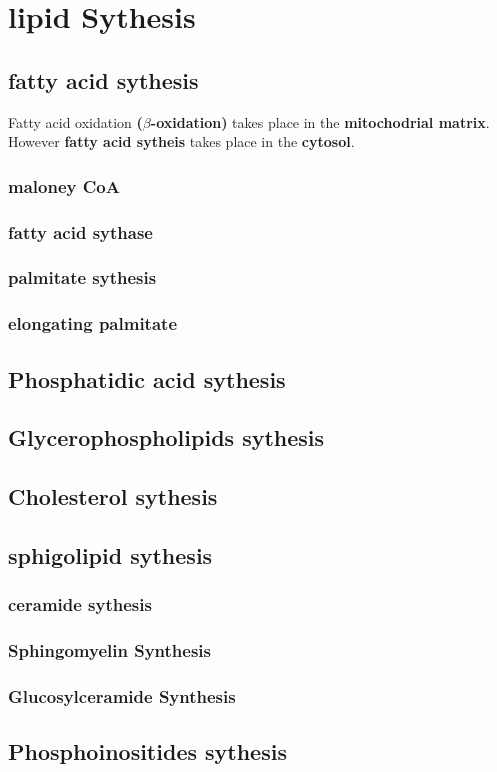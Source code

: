 \section{lipid Sythesis}
\subsection{fatty acid sythesis}
Fatty acid oxidation \textbf{($\beta$-oxidation)} takes place in the \textbf{mitochodrial matrix}. However \textbf{fatty acid sytheis} takes place in the \textbf{cytosol}. 
\subsubsection{maloney CoA}

\subsubsection{fatty acid sythase}
\subsubsection{palmitate sythesis}
\subsubsection{elongating palmitate}


\subsection{Phosphatidic acid sythesis}
\subsection{Glycerophospholipids sythesis}
\subsection{Cholesterol sythesis}
\subsection{sphigolipid sythesis}
\subsubsection{ceramide sythesis}
\subsubsection{Sphingomyelin Synthesis}
\subsubsection{Glucosylceramide Synthesis}
\subsection{Phosphoinositides sythesis}